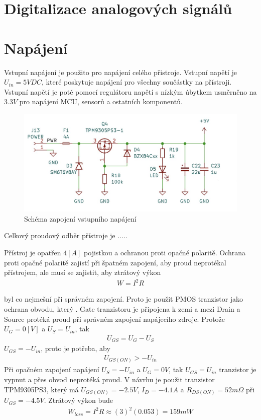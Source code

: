 \section{Digitalizace analogových signálů}



\section{Napájení}
Vstupní napájení je použito pro napájení celého přistroje. Vstupní napětí je $U_{in} = 5V DC$, které poskytuje napájení pro všechny součástky na přístroji. Vstupní napětí je poté pomocí regulátoru napětí s nízkým úbytkem usměrněno na $3.3 V$ pro napájení MCU, sensorů a ostatních komponentů.

\begin{figure}[H]
\includegraphics[width=0.9\linewidth]{pictures/power.jpg}
\caption{Schéma zapojení vstupního napájení}
\label{fig:power_input}
\end{figure}

Celkový proudový odběr přístroje je ..... 

Přístroj je opatřen $4 [A]$ pojistkou a ochranou proti opačné polaritě.
Ochrana proti opačné polaritě zajistí při špatném zapojení, aby proud neprotékal přístrojem, ale musí se zajistit, aby ztrátový výkon 
\begin{align*}
  W = I^2 R  
\end{align*}

byl co nejmešní při správném zapojení. Proto je použit PMOS tranzistor jako ochrana obvodu, který . Gate tranzistoru je připojena k zemi a mezi Drain a Source protéká proud při správném zapojení napájecího zdroje. Protože $ U_G = 0 [V]$ a $U_S = U_{in}$, tak 
\begin{align*}
U_{GS} = U_G - U_S
\end{align*}
$U_{GS} = -U_{in} $, proto je potřeba, aby 
\begin{align*}
 U_{GS(ON)} > -U_{in}   
\end{align*}
Při opačném zapojení napájení $U_S = -U_{in}$ a $ U_G = 0 V$, tak  $U_{GS} = U_{in}$ tranzistor je vypnut a přes obvod neprotéká proud.
V návrhu je použit tranzistor TPM9305PS3, který má  $U_{GS(ON)} = -2.5V $,  $I_D = -4.1A$ a $R_{DS(ON)} = 52m \Omega$ při $U_{GS} = -4.5V$. 
Ztrátový výkon bude 
\begin{align*}
  W_{loss} = I^2 R \approx (3)^2 (0.053) =  159 mW
\end{align*}

